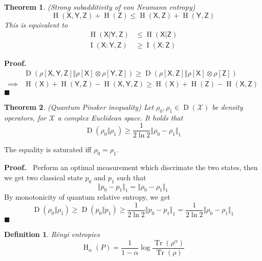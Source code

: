 \documentclass[aps,pra,onecolumn,notitlepage,superscriptaddress]{revtex4-1}
\newcommand{\reg}[1]{\mathsf{#1}}
\newcommand{\spc}[1]{\mathcal{#1}}
\newcommand{\Tr}{\operatorname{Tr}}
\newcommand{\op}[1]{\operatorname{#1}}
\newtheorem{theo}{Theorem}
\newtheorem{defi}{Definition}
\def\Proof{{\bf Proof.~}}
\def\qed{$\blacksquare$ \newline}
\begin{document}
    \begin{theo}
        (Strong subadditivity of von Neumann entropy)
        \begin{equation}
            \op H(\reg X, \reg Y, \reg Z) + \op H(\reg Z) \leq \op H(\reg X, \reg Z) + \op H(\reg Y, \reg Z)
        \end{equation}
        This is equivalent to
        \begin{align*}
            \op H(\reg X | \reg {Y,Z}) &\leq \op H(\reg X | \reg Z) \\
            \op I(\reg X : \reg {Y,Z}) &\geq \op I(\reg X : \reg Z)
        \end{align*}
    \end{theo}
    \Proof 
    \begin{align*}
        &\op D(\rho[\reg X, \reg Y, \reg Z] \Vert \rho[\reg X] \otimes \rho[\reg Y, \reg Z]) \geq \op D(\rho[\reg X, \reg Z] \Vert \rho[\reg X] \otimes \rho[\reg Z]) \\
        \implies & \op H(\reg X) + \op H(\reg Y, \reg Z) - \op H(\reg X, \reg Y, \reg Z) \geq \op H(\reg X) + \op H(\reg Z) - \op H(\reg X, \reg Z)
    \end{align*}
    \qed

    \begin{theo}
        (Quantum Pinsker inequality) Let $\rho_0 ,\rho_1 \in \op D(\spc X)$ be density operators, for $\spc X$ a complex Euclidean space. It holds that
        \begin{equation}
            \op D(\rho_0 \Vert \rho_1) \geq \frac{1}{2\ln 2} \Vert \rho_0-\rho_1 \Vert_1
        \end{equation}
    \end{theo}
    The equality is saturated iff $\rho_0 = \rho_1$.

    \Proof
    Perform an optimal measurement which discrimate the two states, then we get two classical state $p_0$ and $p_1$ such that
    \begin{equation}
        \Vert p_0-p_1 \Vert_1 = \Vert \rho_0-\rho_1 \Vert_1
    \end{equation}
    By monotonicity of quantum relative entropy, we get
    \begin{equation}
        \op D(\rho_0 \Vert \rho_1) \geq \op D(p_0 \Vert p_1) \geq \frac{1}{2\ln 2} \Vert p_0-p_1 \Vert_1 = \frac{1}{2\ln 2} \Vert \rho_0-\rho_1 \Vert_1
    \end{equation}
    \qed

    \begin{defi} 
        R\'{e}nyi entropies
        \begin{equation}
            \op H_\alpha(P) = \frac{1}{1-\alpha} \log \frac{\Tr(\rho^ \alpha)}{\Tr (\rho)}
        \end{equation}
    \end{defi}
\end{document}
